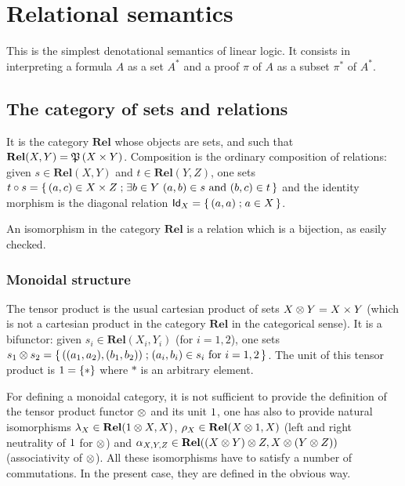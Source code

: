 \chapter{Relational semantics}\label{relational-semantics}

This is the simplest denotational semantics of linear logic. It consists
in interpreting a formula \(A\) as a set \(A^*\) and a proof \(\pi\) of
\(A\) as a subset \(\pi^*\) of \(A^*\).

\section{The category of sets and relations}\label{the-category-of-sets-and-relations}

It is the category \(\mathbf{Rel}\) whose objects are sets, and such
that \(\mathbf{Rel}(X,Y)=\mathfrak{P}\left(X\times Y\right)\). Composition is the
ordinary composition of relations: given \(s\in\mathbf{Rel}(X,Y)\) and
\(t\in\mathbf{Rel}(Y,Z)\), one sets
\(t\circ s=\left\{\,{(a,c)\in X\times Z}\mathrel{;}{\exists b\in Y\ (a,b)\in s\ \text{and}\ (b,c)\in t}\,\right\}\)
and the identity morphism is the diagonal relation
\(\mathsf{Id}_X=\left\{\,{(a,a)}\mathrel{;}{a\in X}\,\right\}\).

An isomorphism in the category \(\mathbf{Rel}\) is a relation which is a
bijection, as easily checked.

\subsection{Monoidal structure}\label{monoidal-structure}

The tensor product is the usual cartesian product of sets
\(X\otimes Y=X\times Y\) (which is not a cartesian product in the category
\(\mathbf{Rel}\) in the categorical sense). It is a bifunctor: given
\(s_i\in\mathbf{Rel}(X_i,Y_i)\) (for \(i=1,2\)), one sets
\(s_1\tens s_2=\set{((a_1,a_2),(b_1,b_2))}{(a_i,b_i)\in s_i\ \text{for}\ i=1,2}\).
The unit of this tensor product is \(1=\{*\}\) where \(*\) is an
arbitrary element.

For defining a monoidal category, it is not sufficient to provide the
definition of the tensor product functor \(\otimes\) and its unit
\(1\), one has also to provide natural isomorphisms
\(\lambda_X\in\mathbf{Rel}(1\otimes X,X)\),
\(\rho_X\in\mathbf{Rel}(X\otimes1,X)\) (left and right neutrality of
\(1\) for \(\otimes\)) and
\(\alpha_{X,Y,Z}\in\mathbf{Rel}((X\otimes Y)\otimes Z,X\otimes(Y\otimes Z))\)
(associativity of \(\otimes\)). All these isomorphisms have to satisfy a
number of commutations. In the present case, they are defined in the
obvious way.

